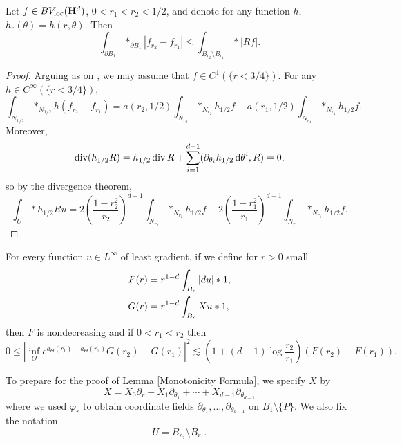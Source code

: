 \begin{lemma}\label{Giusti53}
Let $f \in BV_{\mathrm{loc}}(\mathbf H^d)$, $0 < r_1 < r_2 < 1/2$, and denote for any function $h$, $h_r(\theta) = h(r, \theta)$. Then
$$\int_{\partial B_1} *_{\partial B_1} |f_{r_2} - f_{r_1}| \leq \int_{B_{r_2} \setminus B_{r_1}} *|Rf|.$$
\end{lemma}
\begin{proof}
Arguing as on \cite[pg64]{Giusti77}, we may assume that $f \in C^1(\{r < 3/4\})$.
For any $h \in C^\infty(\{r < 3/4\})$,
$$\int_{N_{1/2}} *_{N_{1/2}} h(f_{r_2} - f_{r_1}) = a(r_2, 1/2) \int_{N_{r_2}} *_{N_{r_2}} h_{1/2} f - a(r_1, 1/2) \int_{N_{r_1}} *_{N_{r_1}} h_{1/2} f.$$
Moreover,
$$\operatorname{div}(h_{1/2} R) = h_{1/2} \operatorname{div} R + \sum_{i=1}^{d - 1} (\partial_{\theta_i}h_{1/2} \mathop{}\!\mathrm{d} \theta^i, R) = 0,$$
so by the divergence theorem,
$$\int_U *h_{1/2} Ru = 2\left(\frac{1 - r_2^2}{r_2}\right)^{d - 1}\int_{N_{r_2}} *_{N_{r_2}} h_{1/2} f - 2\left(\frac{1 - r_1^2}{r_1}\right)^{d - 1}\int_{N_{r_1}} *_{N_{r_1}} h_{1/2} f.$$
\end{proof}

\begin{lemma}\label{Monotonicity Formula}
For every function $u \in L^\infty$ of least gradient, if we define for $r > 0$ small
\begin{align*}
    F(r) &= r^{1 - d} \int_{B_r} |du| *1,\\
    G(r) &= r^{1 - d} \int_{B_r} Xu *1,
\end{align*}
then $F$ is nondecreasing and if $0 < r_1 < r_2$ then
\begin{equation}\label{StrongMonotonicity}
0 \leq \left|\inf_\Theta e^{a_\Theta(r_1) - a_\Theta(r_2)}G(r_2) - G(r_1)\right|^2 \lesssim \left(1 + (d - 1)\log \frac{r_2}{r_1}\right)(F(r_2) - F(r_1)).
\end{equation}
\end{lemma}

To prepare for the proof of Lemma \ref{Monotonicity Formula}, we specify $X$ by
$$X = X_0 \partial_r + X_1 \partial_{\theta_1} + \cdots + X_{d - 1} \partial_{\theta_{d - 1}}$$
where we used $\varphi_r$ to obtain coordinate fields $\partial_{\theta_1}, \dots, \partial_{\theta_{d - 1}}$ on $B_1 \setminus \{P\}$.
We also fix the notation
$$U = B_{r_2} \setminus B_{r_1}.$$

